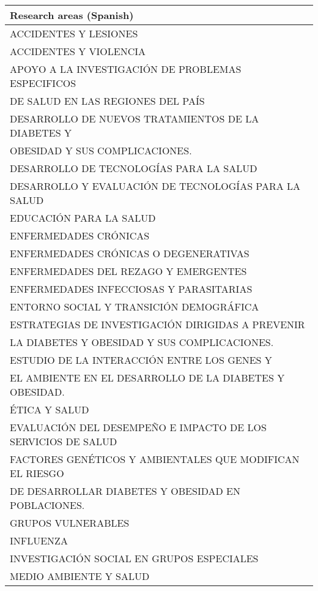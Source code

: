 \documentclass[9.5pt]{article}
\begin{document}
\begin{table}
\small
  \centering
\begin{tabular}{| l |}
\hline
\bf{Research areas (Spanish)} \\ \hline

ACCIDENTES Y LESIONES	\\ \hline
ACCIDENTES Y VIOLENCIA	\\ \hline
APOYO A LA INVESTIGACIÓN DE PROBLEMAS ESPECIFICOS\\ DE SALUD EN LAS REGIONES DEL PAÍS \\ \hline
DESARROLLO DE NUEVOS TRATAMIENTOS DE LA DIABETES Y\\ OBESIDAD Y SUS COMPLICACIONES.			\\ \hline
DESARROLLO DE TECNOLOGÍAS PARA LA SALUD			\\ \hline
DESARROLLO Y EVALUACIÓN DE TECNOLOGÍAS PARA LA SALUD			\\ \hline
EDUCACIÓN PARA LA SALUD			\\ \hline
ENFERMEDADES CRÓNICAS			\\ \hline
ENFERMEDADES CRÓNICAS O DEGENERATIVAS			\\ \hline
ENFERMEDADES DEL REZAGO Y EMERGENTES			\\ \hline
ENFERMEDADES INFECCIOSAS Y PARASITARIAS			\\ \hline
ENTORNO SOCIAL Y TRANSICIÓN DEMOGRÁFICA			\\ \hline
ESTRATEGIAS DE INVESTIGACIÓN DIRIGIDAS A PREVENIR\\ LA DIABETES Y OBESIDAD Y SUS COMPLICACIONES.			\\ \hline
ESTUDIO DE LA INTERACCIÓN ENTRE LOS GENES Y\\ EL AMBIENTE EN EL DESARROLLO DE LA DIABETES Y OBESIDAD.			\\ \hline
ÉTICA Y SALUD			\\ \hline
EVALUACIÓN DEL DESEMPEÑO E IMPACTO DE LOS SERVICIOS DE SALUD			\\ \hline
FACTORES GENÉTICOS Y AMBIENTALES QUE MODIFICAN EL RIESGO\\ DE DESARROLLAR DIABETES Y OBESIDAD EN POBLACIONES.			\\ \hline
GRUPOS VULNERABLES			\\ \hline
INFLUENZA			\\ \hline
INVESTIGACIÓN SOCIAL EN GRUPOS ESPECIALES			\\ \hline
MEDIO AMBIENTE Y SALUD			\\ \hline

\end{tabular}
\end{table}
\end{document}
